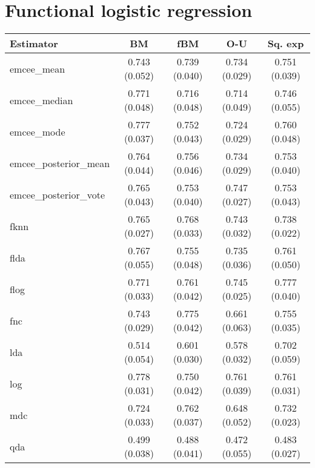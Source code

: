\newpage

\section*{Functional logistic regression}

\begin{table}[htbp!]
  \centering
  \begin{tabular}{lcccc}
\toprule
            \textbf{Estimator} &            \textbf{BM} &           \textbf{fBM} &           \textbf{O-U} &        \textbf{Sq. exp} \\
\midrule
          emcee\_mean & 0.743 (0.052) &       0.739 (0.040) &      0.734 (0.029) & 0.751 (0.039) \\
        emcee\_median & 0.771 (0.048) &       0.716 (0.048) &      0.714 (0.049) & 0.746 (0.055) \\
          emcee\_mode & 0.777 (0.037) &       0.752 (0.043) &      0.724 (0.029) & 0.760 (0.048) \\
emcee\_posterior\_mean & 0.764 (0.044) &       0.756 (0.046) &      0.734 (0.029) & 0.753 (0.040) \\
emcee\_posterior\_vote & 0.765 (0.043) &       0.753 (0.040) &      0.747 (0.027) & 0.753 (0.043) \\
                fknn & 0.765 (0.027) &       0.768 (0.033) &      0.743 (0.032) & 0.738 (0.022) \\
                flda & 0.767 (0.055) &       0.755 (0.048) &      0.735 (0.036) & 0.761 (0.050) \\
                flog & 0.771 (0.033) &       0.761 (0.042) &      0.745 (0.025) & 0.777 (0.040) \\
                 fnc & 0.743 (0.029) &       0.775 (0.042) &      0.661 (0.063) & 0.755 (0.035) \\
                 lda & 0.514 (0.054) &       0.601 (0.030) &      0.578 (0.032) & 0.702 (0.059) \\
                 log & 0.778 (0.031) &       0.750 (0.042) &      0.761 (0.039) & 0.761 (0.031) \\
                 mdc & 0.724 (0.033) &       0.762 (0.037) &      0.648 (0.052) & 0.732 (0.023) \\
                 qda & 0.499 (0.038) &       0.488 (0.041) &      0.472 (0.055) & 0.483 (0.027) \\

\bottomrule
\toprule


\end{tabular}
\end{table}
